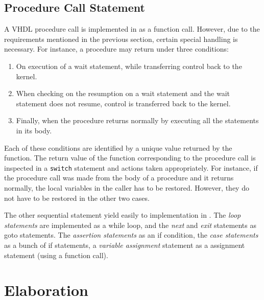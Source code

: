 \documentclass[11pt]{article}
\begin{document}
\subsection{Procedure Call Statement}
\label{sec:proc_call}

A VHDL procedure call is implemented in \tyvis\/ as a \Cpp\/ function call.
However, due to the requirements mentioned in the previous section,
certain special handling is necessary.  For instance, a procedure may
return under three conditions:

\begin{enumerate}
\item On execution of a wait statement, while transferring control back to
  the kernel.
\item When checking on the resumption on a wait statement and the wait
  statement does not resume, control is transferred back to the kernel.
\item Finally, when the procedure returns normally by executing all the
  statements in its body.
\end{enumerate}

Each of these conditions are identified by a unique value returned by the
\Cpp\/ function.  The return value of the \Cpp\/ function corresponding to the
procedure call is inspected in a \texttt{switch} statement and actions
taken appropriately.  For instance, if the procedure call was made
from the body of a procedure and it returns normally, the local
variables in the caller has to be restored.  However, they do not have
to be restored in the other two cases.

The other sequential statement yield easily to implementation in
\Cpp\/.  The \textit{loop statements} are implemented as a \Cpp\/
while loop, and the \textit{next} and \textit{exit} statements as
\Cpp\/ goto statements.  The \textit{assertion statements} as an if
condition, the \textit{case statements} as a bunch of if statements, a
\textit{variable assignment} statement as a \Cpp\/ assignment
statement (using a function call).


\section{Elaboration}
\label{chp:elaboration}
\end{document}
